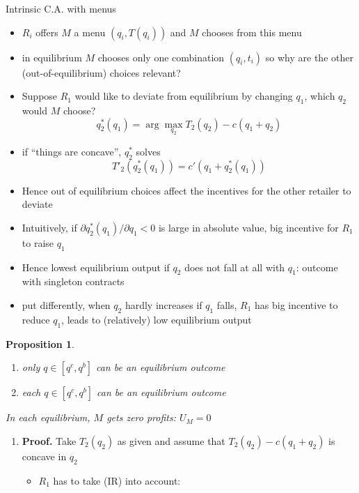 \documentclass[11pt,english]{beamer}
\newcommand{\dif}{\partial}
\newtheorem{proposition}{Proposition}
\begin{document}
\begin{frame}[allowframebreaks]{Intrinsic C.A. with menus}
  \begin{itemize}
  \item $R_i$ offers $M$ a menu $(q_i,T(q_i))$ and $M$ chooses from
    this menu
  \item in equilibrium $M$ chooses only one combination $(q_i,t_i)$ so
    why are the other (out-of-equilibrium) choices relevant?
  \item Suppose $R_1$ would like to deviate from equilibrium by
    changing $q_1$, which $q_2$ would $M$ choose?
    \begin{equation} \label{eq:q2star}
      q_2^*(q_1) = \arg\max_{q_2} T_2(q_2)-c(q_1+q_2)
    \end{equation}
  \item if ``things are concave'', $q_2^*$ solves
    \begin{equation}
      \label{eq:q2starFOC}
      T'_2(q_2^*(q_1))=c'(q_1+q_2^*(q_1))
    \end{equation}
  \item Hence out of equilibrium choices affect the incentives for the
    other retailer to deviate
  \item Intuitively, if $\dif q^*_2(q_1)/\dif q_1 < 0$ is large in
    absolute value, big incentive for $R_1$ to raise $q_1$
  \item Hence lowest equilibrium output if $q_2$ does not fall at all
    with $q_1$: outcome with singleton contracts
  \item put differently, when $q_2$ hardly increases if $q_1$ falls,
    $R_1$ has big incentive to reduce $q_1$, leads to (relatively) low
    equilibrium output
  \end{itemize}
  \begin{proposition}
    \begin{enumerate}
    \item only $q \in [q^c,q^b]$ can be an equilibrium outcome
    \item each $q \in [q^c,q^b]$ can be an equilibrium outcome
    \end{enumerate}
   In each equilibrium, $M$ gets zero profits: $U_M =0$
  \end{proposition}
    \begin{enumerate}
    \item  \textbf{Proof.} Take $T_2(q_2)$ as given and assume that
      $T_2(q_2)-c(q_1+q_2)$ is concave in $q_2$
      \begin{itemize}
      \item $R_1$ has to take (IR) into account:

\end{itemize}
\end{enumerate}
\end{frame}
\end{document}
